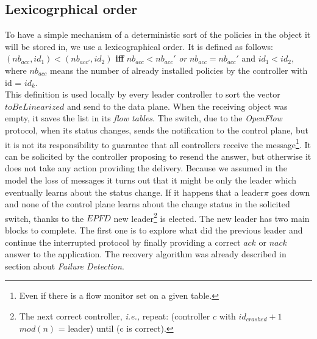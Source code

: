 \documentclass{article}
\theoremstyle{remark}
\begin{document}
\subsection{Lexicogrphical order}
To have a simple mechanism of a deterministic sort of the policies in the object it will be stored in, we use a lexicographical order.
It is defined as follows:\\
$(nb_{acc}, id_1 )<(nb_{acc'}, id_2)$  \textbf{iff}  $nb_{acc} < nb_{acc}'  $ \emph{or} $nb_{acc} = nb_{acc}'$ and $id_1<id_2$, where $nb_{acc}$ means the number of already installed policies by the controller with id = $id_k$.\\
This definition is used locally by every leader controller to sort the vector $toBeLinearized$ and send to the data plane. When the receiving object was empty, it saves the list in its \emph{flow tables}. The switch, due to the \emph{OpenFlow} protocol, when its status changes, sends the notification to the control plane, but it is not its responsibility to guarantee that all controllers receive the message\footnote{Even if there is a flow monitor set on a given table.}. It can be solicited by the controller proposing to resend the answer, but otherwise it does not take any action providing the delivery. Because we assumed in the model the loss of messages it turns out that it might be only the leader which eventually learns about the status change.
If it happens that a leader$\pi$ goes down and none of the control plane learns about the change status in the solicited switch, thanks to the $EPFD$ new leader\footnote{The next correct controller, \emph{i.e.,} repeat: (controller $c$ with $id_{crashed}+1$ $mod(n)$ = leader) until (c is correct). } is elected.
The new leader has two main blocks to complete. The first one is to explore what did the previous leader and continue the interrupted protocol by finally providing a correct $ack$ or $nack$ answer to the application. The recovery algorithm was already described in section about \emph{Failure Detection}. \\
 
\end{document}
